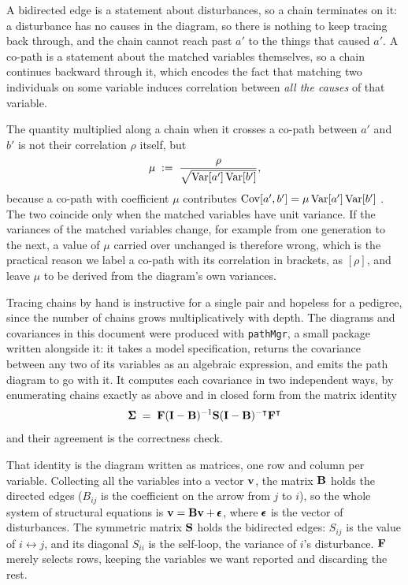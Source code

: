\documentclass[12pt]{article}
\numberwithin{equation}{section}
\begin{document}
A bidirected edge is a statement about disturbances, so a chain terminates on it: a disturbance has no causes in the diagram, so there is nothing to keep tracing back through, and the chain cannot reach past $a'$ to the things that caused $a'$.
A co-path is a statement about the matched variables themselves, so a chain continues backward through it, which encodes the fact that matching two individuals on some variable induces correlation between \emph{all the causes} of that variable.

The quantity multiplied along a chain when it crosses a co-path between $a'$ and $b'$ is not their correlation $\rho$ itself, but
\begin{equation}\label{eq:copath-mu}
    \mu \;:=\; \frac{\rho}{\sqrt{\mathrm{Var}[a']\,\mathrm{Var}[b']}} ,
\end{equation}
because a co-path with coefficient $\mu$ contributes $\mathrm{Cov}[a',b'] = \mu\,\mathrm{Var}[a']\,\mathrm{Var}[b']$ \citep{Sunde2025NatComm}.
The two coincide only when the matched variables have unit variance.
If the variances of the matched variables change, for example from one generation to the next, a value of $\mu$ carried over unchanged is therefore wrong, which is the practical reason we label a co-path with its correlation in brackets, as $[\rho]$, and leave $\mu$ to be derived from the diagram's own variances.

Tracing chains by hand is instructive for a single pair and hopeless for a pedigree, since the number of chains grows multiplicatively with depth.
The diagrams and covariances in this document were produced with \texttt{pathMgr}, a small package written alongside it: it takes a model specification, returns the covariance between any two of its variables as an algebraic expression, and emits the path diagram to go with it.
It computes each covariance in two independent ways, by enumerating chains exactly as above and in closed form from the matrix identity
\begin{equation}\label{eq:ram}
    \pmb{\Sigma} \;=\; \mathbf{F}(\mathbf{I}-\mathbf{B})^{-1}\mathbf{S}(\mathbf{I}-\mathbf{B})^{-\intercal}\mathbf{F}^{\intercal}
\end{equation}
and their agreement is the correctness check.

That identity is the diagram written as matrices, one row and column per variable.
Collecting all the variables into a vector $\mathbf{v}$, the matrix $\mathbf{B}$ holds the directed edges ($B_{ij}$ is the coefficient on the arrow from $j$ to $i$), so the whole system of structural equations is $\mathbf{v} = \mathbf{B}\mathbf{v} + \pmb{\epsilon}$, where $\pmb{\epsilon}$ is the vector of disturbances.
The symmetric matrix $\mathbf{S}$ holds the bidirected edges: $S_{ij}$ is the value of $i \leftrightarrow j$, and its diagonal $S_{ii}$ is the self-loop, the variance of $i$'s disturbance.
$\mathbf{F}$ merely selects rows, keeping the variables we want reported and discarding the rest.
\end{document}
